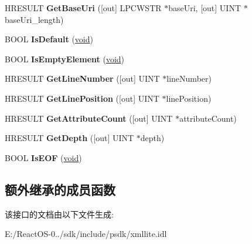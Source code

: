 \begin{DoxyCompactItemize}
\item 
\mbox{\label{interface_i_xml_reader_a6324dc9567dc2070d7c011084ac782d9}} 
H\+R\+E\+S\+U\+LT {\bfseries Get\+Base\+Uri} (\mbox{[}out\mbox{]} L\+P\+C\+W\+S\+TR $\ast$base\+Uri, \mbox{[}out\mbox{]} U\+I\+NT $\ast$base\+Uri\+\_\+length)
\item 
\mbox{\label{interface_i_xml_reader_af07e23166e23256b4a2dc8faab817dec}} 
B\+O\+OL {\bfseries Is\+Default} (\hyperlink{interfacevoid}{void})
\item 
\mbox{\label{interface_i_xml_reader_aff010732e58a91642748f67439509bdb}} 
B\+O\+OL {\bfseries Is\+Empty\+Element} (\hyperlink{interfacevoid}{void})
\item 
\mbox{\label{interface_i_xml_reader_ac8a310ecac46883053d15d0415659c94}} 
H\+R\+E\+S\+U\+LT {\bfseries Get\+Line\+Number} (\mbox{[}out\mbox{]} U\+I\+NT $\ast$line\+Number)
\item 
\mbox{\label{interface_i_xml_reader_a947ed3121315036c9c65a1d92fc941bf}} 
H\+R\+E\+S\+U\+LT {\bfseries Get\+Line\+Position} (\mbox{[}out\mbox{]} U\+I\+NT $\ast$line\+Position)
\item 
\mbox{\label{interface_i_xml_reader_a08a3d4d4989871f1d194cd4f092f8a8c}} 
H\+R\+E\+S\+U\+LT {\bfseries Get\+Attribute\+Count} (\mbox{[}out\mbox{]} U\+I\+NT $\ast$attribute\+Count)
\item 
\mbox{\label{interface_i_xml_reader_a64dc16938f72f8255d1663e9290ef67f}} 
H\+R\+E\+S\+U\+LT {\bfseries Get\+Depth} (\mbox{[}out\mbox{]} U\+I\+NT $\ast$depth)
\item 
\mbox{\label{interface_i_xml_reader_a544eff840614b5fe99bc9e4cb63388d2}} 
B\+O\+OL {\bfseries Is\+E\+OF} (\hyperlink{interfacevoid}{void})
\end{DoxyCompactItemize}
\subsection*{额外继承的成员函数}


该接口的文档由以下文件生成\+:\begin{DoxyCompactItemize}
\item 
E\+:/\+React\+O\+S-\/0../sdk/include/psdk/xmllite.\+idl\end{DoxyCompactItemize}
